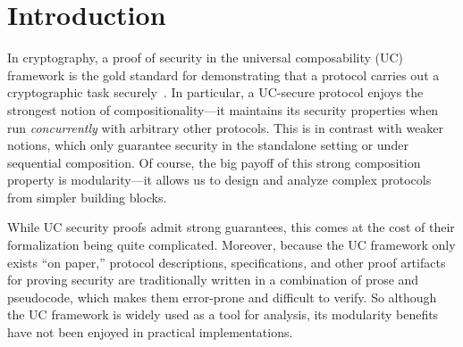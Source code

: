 \section{Introduction}
\label{sec:introduction}

In cryptography, a proof of security in the universal composability (UC)
framework is the gold standard for demonstrating that a protocol carries out a
cryptographic task securely~\cite{canetti2001universally}. In particular, a
UC-secure protocol enjoys the strongest notion of compositionality---it maintains
its security properties when run \emph{concurrently} with arbitrary other
protocols. This is in contrast with weaker notions, which only guarantee
security in the standalone setting or under sequential composition. Of course,
the big payoff of this strong composition property is modularity---it allows us to
design and analyze complex protocols from simpler building blocks.

\begin{comment}
In a nutshell, security proofs in UC follow the real/ideal
paradigm~\cite{goldreich1987play}. The security requirements of a given task are
defined as a program for a \emph{single trusted process} called an \emph{ideal
  functionality}, which runs in an imagined ideal world. This serves as a
specification of the desired security properties for a distributed protocol
achieving the task across \emph{many unstrusted processes}, which runs in the
real world. Roughly speaking, we say that a protocol $\pi$ \emph{emulates} an
ideal functionality $\mc{F}$ (i.e., it meets its specification) if every
adversarial behavior in the real world can also be exhibited in the ideal world.
\end{comment}

While UC security proofs admit strong guarantees, this comes at the cost of
their formalization being quite complicated. Moreover, because the UC framework
only exists ``on paper,'' protocol descriptions, specifications, and other proof
artifacts for proving security are traditionally written in a combination of
prose and pseudocode, which makes them error-prone and difficult to
verify.  So although the UC framework is widely
used as a tool for analysis, its modularity benefits have not been enjoyed in
practical implementations.

